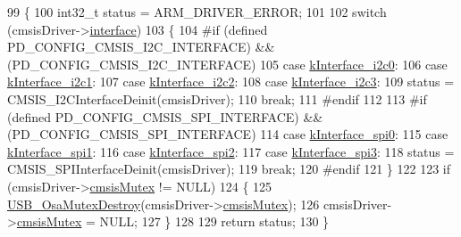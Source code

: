 \begin{DoxyCode}
99 \{
100     int32\_t status = ARM\_DRIVER\_ERROR;
101 
102     \textcolor{keywordflow}{switch} (cmsisDriver->\hyperlink{struct__cmsis__drier__adapter_a51a572fa7a648387cf481b45b862457c}{interface})
103     \{
104 \textcolor{preprocessor}{#if (defined PD\_CONFIG\_CMSIS\_I2C\_INTERFACE) && (PD\_CONFIG\_CMSIS\_I2C\_INTERFACE)
}
105 \textcolor{preprocessor}{}        \textcolor{keywordflow}{case} \hyperlink{group__usb__pd__stack_gga4aed694f998da91dea8d218596d65c1ea0e6fc11f3fbc9732619f2083042e7e17}{kInterface\_i2c0}:
106         \textcolor{keywordflow}{case} \hyperlink{group__usb__pd__stack_gga4aed694f998da91dea8d218596d65c1eaf78fb0f4bdd4db6e8a2e5dab05ba59d2}{kInterface\_i2c1}:
107         \textcolor{keywordflow}{case} \hyperlink{group__usb__pd__stack_gga4aed694f998da91dea8d218596d65c1ea7e08032b6509673dc643a7d01a5baec4}{kInterface\_i2c2}:
108         \textcolor{keywordflow}{case} \hyperlink{group__usb__pd__stack_gga4aed694f998da91dea8d218596d65c1ea369545de00e8d0fb91e9f065d725c16c}{kInterface\_i2c3}:
109             status = CMSIS\_I2CInterfaceDeinit(cmsisDriver);
110             \textcolor{keywordflow}{break};
111 \textcolor{preprocessor}{#endif
}
112 \textcolor{preprocessor}{}
113 \textcolor{preprocessor}{#if (defined PD\_CONFIG\_CMSIS\_SPI\_INTERFACE) && (PD\_CONFIG\_CMSIS\_SPI\_INTERFACE)
}
114 \textcolor{preprocessor}{}        \textcolor{keywordflow}{case} \hyperlink{group__usb__pd__stack_gga4aed694f998da91dea8d218596d65c1ea48b48a50986d3b6fd9e7640cbea852ef}{kInterface\_spi0}:
115         \textcolor{keywordflow}{case} \hyperlink{group__usb__pd__stack_gga4aed694f998da91dea8d218596d65c1ea178b943373d02f27c53232f7e31e62a6}{kInterface\_spi1}:
116         \textcolor{keywordflow}{case} \hyperlink{group__usb__pd__stack_gga4aed694f998da91dea8d218596d65c1ea1a8206ebb4a5aa81b0401b26d239ad9d}{kInterface\_spi2}:
117         \textcolor{keywordflow}{case} \hyperlink{group__usb__pd__stack_gga4aed694f998da91dea8d218596d65c1ea0842cd2e8c57954daf912b6d7b648e9f}{kInterface\_spi3}:
118             status = CMSIS\_SPIInterfaceDeinit(cmsisDriver);
119             \textcolor{keywordflow}{break};
120 \textcolor{preprocessor}{#endif
}
121 \textcolor{preprocessor}{}    \}
122 
123     \textcolor{keywordflow}{if} (cmsisDriver->\hyperlink{struct__cmsis__drier__adapter_a952d05d8262ef9aebfa6ca9c4d62fe46}{cmsisMutex} != NULL)
124     \{
125         \hyperlink{group__usb__os__abstraction_ga68f890c3d76f212e6fa8cf787b918a5b}{USB\_OsaMutexDestroy}(cmsisDriver->\hyperlink{struct__cmsis__drier__adapter_a952d05d8262ef9aebfa6ca9c4d62fe46}{cmsisMutex});
126         cmsisDriver->\hyperlink{struct__cmsis__drier__adapter_a952d05d8262ef9aebfa6ca9c4d62fe46}{cmsisMutex} = NULL;
127     \}
128 
129     \textcolor{keywordflow}{return} status;
130 \}
\end{DoxyCode}


